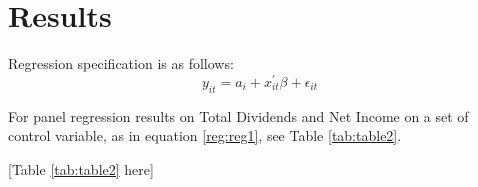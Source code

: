 \section{Results}

Regression specification is as follows:
\begin{equation}
    \label{reg:reg1}
    y_{it} = a_i + x_{it}^{\prime} \beta + \epsilon_{it}
\end{equation}

For panel regression results on Total Dividends and Net Income on a set of control variable, as in equation \ref{reg:reg1}, see Table \ref{tab:table2}.

\begin{center}
    [Table \ref{tab:table2} here]
\end{center}
